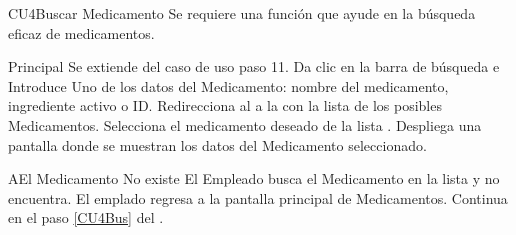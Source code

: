 \begin{UseCase}{CU4}{Buscar Medicamento}{
		Se requiere una función que ayude en la búsqueda eficaz de medicamentos.
	}
	\end{UseCase}
	\begin{UCtrayectoria}{Principal}
		\UCpaso Se extiende del caso de uso  paso 11.
		\UCpaso[\UCactor] Da clic en la barra de búsqueda  e Introduce Uno de los datos del Medicamento: nombre del medicamento,  ingrediente activo o ID.
		\UCpaso Redirecciona al \UCactor a la   con la lista de los posibles Medicamentos.
		\UCpaso[\UCactor] Selecciona el medicamento deseado de la lista  \label{CU4Bus}.
		\UCpaso Despliega una pantalla donde se muestran los datos del Medicamento seleccionado.
	\end{UCtrayectoria}		
		\begin{UCtrayectoriaA}{A}{El Medicamento No existe}
			\UCpaso[\UCactor] El Empleado busca el Medicamento en la lista y no encuentra.
			\UCpaso[\UCactor] El emplado regresa a la pantalla principal de Medicamentos.
			\UCpaso Continua en el paso \ref{CU4Bus} del .
		\end{UCtrayectoriaA}
	

